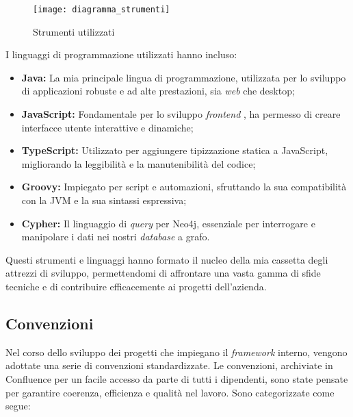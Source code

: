 \begin{figure}[!h] 
  \centering 
  \texttt{[image: diagramma\_strumenti]} 
  \caption{Strumenti utilizzati}
  \label{fig:diagramma_strumenti}
\end{figure}

I linguaggi di programmazione utilizzati hanno incluso:

\begin{itemize}
\item \textbf{Java:} La mia principale lingua di programmazione, utilizzata per lo sviluppo di applicazioni robuste e ad alte prestazioni, sia \textit{web} che desktop;

\item \textbf{JavaScript:} Fondamentale per lo sviluppo \textit{frontend}  , ha permesso di creare interfacce utente interattive e dinamiche;

\item \textbf{TypeScript:} Utilizzato per aggiungere tipizzazione statica a JavaScript, migliorando la leggibilità e la manutenibilità del codice;

\item \textbf{Groovy:} Impiegato per script e automazioni, sfruttando la sua compatibilità con la \gls{JVM} e la sua sintassi espressiva;

\item \textbf{Cypher:} Il linguaggio di \textit{query} per Neo4j, essenziale per interrogare e manipolare i dati nei nostri \textit{database} a grafo.
\end{itemize}

Questi strumenti e linguaggi hanno formato il nucleo della mia cassetta degli attrezzi di sviluppo, permettendomi di affrontare una vasta gamma di sfide tecniche e di contribuire efficacemente 
ai progetti dell'azienda.

\subsection{Convenzioni}
Nel corso dello sviluppo dei progetti che impiegano il \textit{framework} interno, vengono adottate una serie di convenzioni standardizzate. 
Le convenzioni, archiviate in Confluence per un facile accesso da parte di tutti i dipendenti, 
sono state pensate per garantire coerenza, efficienza e qualità nel lavoro. Sono categorizzate come segue:

